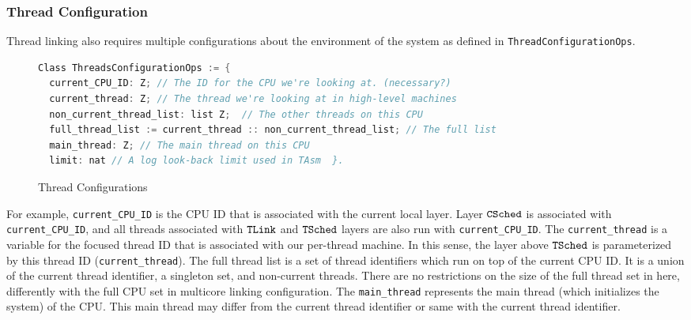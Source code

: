 \subsubsection{Thread Configuration}
Thread linking also requires multiple configurations about the environment of the system as defined in \lstinline$ThreadConfigurationOps$.
\begin{figure}
\begin{lstlisting}[language=C, morekeywords={Class}]
Class ThreadsConfigurationOps := {      
  current_CPU_ID: Z; // The ID for the CPU we're looking at. (necessary?) 
  current_thread: Z; // The thread we're looking at in high-level machines
  non_current_thread_list: list Z;  // The other threads on this CPU 
  full_thread_list := current_thread :: non_current_thread_list; // The full list
  main_thread: Z; // The main thread on this CPU 
  limit: nat // A log look-back limit used in TAsm  }.
\end{lstlisting}
\caption{Thread Configurations}
\label{fig:chapter:linking:thread-configurations}
\end{figure}
For example, \lstinline$current_CPU_ID$ is the CPU ID that is 
associated with the current local layer.
Layer ${{\mathrm{\texttt{CSched}}}}$ is associated with \lstinline$current_CPU_ID$, 
and all threads associated with ${{\mathrm{\texttt{TLink}}}}$ and ${{\mathrm{\texttt{TSched}}}}$ layers 
are also run with  \lstinline$current_CPU_ID$.
The \lstinline$current_thread$ is a variable for the focused thread ID that is associated with our per-thread machine.
In this sense, the layer above ${{\mathrm{\texttt{TSched}}}}$ is parameterized by this thread ID (\lstinline$current_thread$). 
The full thread list is a set of thread identifiers which run on top of the current CPU ID. 
It is a union of the current thread identifier, a singleton set, 
and non-current threads. 
There are no restrictions on the size of the full thread set in here,
differently with the full CPU set in multicore linking configuration.
The \lstinline$main_thread$ represents the main thread (which initializes the system) of the CPU. 
This main thread may differ from the current thread identifier or same with the current thread identifier.


